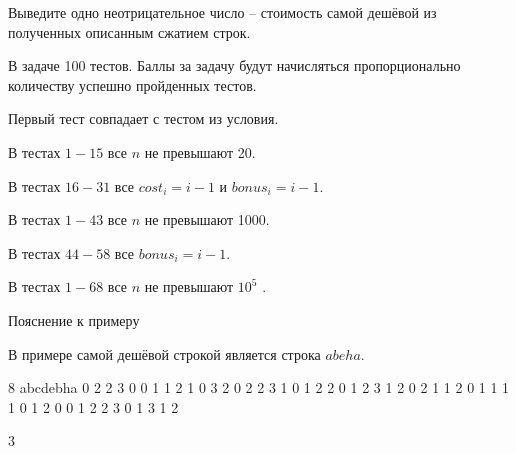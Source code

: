 \outputfmtSection

Выведите одно неотрицательное число – стоимость самой дешёвой из полученных описанным сжатием строк.

\markSection

В задаче 100 тестов. Баллы за задачу будут начисляться пропорционально количеству успешно пройденных тестов.

Первый тест совпадает с тестом из условия.

В тестах $1-15$ все $n$ не превышают 20.

В тестах $16-31$ все $cost_{i} = i - 1$ и $bonus_{i} = i - 1$.

В тестах $1 - 43$ все $n$ не превышают 1000.

В тестах $44 - 58$ все $bonus_{i} = i - 1$.

В тестах $1 - 68$ все $n$ не превышают $10^{5}$ .

Пояснение к примеру

В примере самой дешёвой строкой является строка $abeha$.


\begin{myverbbox}[\small]{\vinput}
    8
    abcdebha
    0 2 2 3 0 0 1 1 2 1 0 3 2 0 2 2 3 1 0 1 2 2 0 1 2 3
    1 2 0 2 1 1 2 0 1 1 1 1 0 1 2 0 0 1 2 2 3 0 1 3 1 2
\end{myverbbox}
\begin{myverbbox}[\small]{\voutput}
    3
\end{myverbbox}

